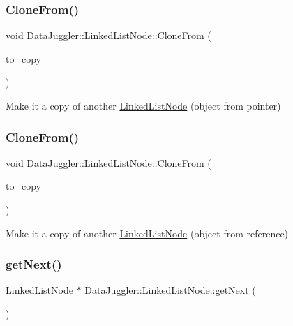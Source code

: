 \subsubsection{\texorpdfstring{Clone\+From()}{CloneFrom()}\hspace{0.1cm}{\footnotesize\ttfamily [1/2]}}
{\footnotesize\ttfamily void Data\+Juggler\+::\+Linked\+List\+Node\+::\+Clone\+From (\begin{DoxyParamCaption}\item[{\hyperlink{classDataJuggler_1_1LinkedListNode}{Linked\+List\+Node} $\ast$}]{to\+\_\+copy }\end{DoxyParamCaption})\hspace{0.3cm}{\ttfamily [virtual]}}

Make it a copy of another \hyperlink{classDataJuggler_1_1LinkedListNode}{Linked\+List\+Node} (object from pointer) \mbox{\label{classDataJuggler_1_1LinkedListNode_ad508fe0c993b16caf5a627e1f265754b}} 
\subsubsection{\texorpdfstring{Clone\+From()}{CloneFrom()}\hspace{0.1cm}{\footnotesize\ttfamily [2/2]}}
{\footnotesize\ttfamily void Data\+Juggler\+::\+Linked\+List\+Node\+::\+Clone\+From (\begin{DoxyParamCaption}\item[{\hyperlink{classDataJuggler_1_1LinkedListNode}{Linked\+List\+Node} \&}]{to\+\_\+copy }\end{DoxyParamCaption})\hspace{0.3cm}{\ttfamily [virtual]}}

Make it a copy of another \hyperlink{classDataJuggler_1_1LinkedListNode}{Linked\+List\+Node} (object from reference) \mbox{\label{classDataJuggler_1_1LinkedListNode_a65f28eec41e48b46fe28579ef029da16}} 
\subsubsection{\texorpdfstring{get\+Next()}{getNext()}}
{\footnotesize\ttfamily \hyperlink{classDataJuggler_1_1LinkedListNode}{Linked\+List\+Node} $\ast$ Data\+Juggler\+::\+Linked\+List\+Node\+::get\+Next (\begin{DoxyParamCaption}{ }\end{DoxyParamCaption})}

